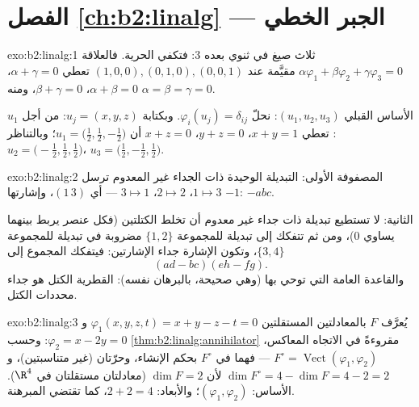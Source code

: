 \section*{الفصل \ref{ch:b2:linalg} --- الجبر الخطي}

\begin{solution}{exo:b2:linalg:1}
ثلاث صيغ في ثنوي بعده $3$: فتكفي الحرية. فالعلاقة
$\alpha\varphi_1 + \beta\varphi_2 + \gamma\varphi_3 = 0$ مقيَّمة عند
$(1,0,0), (0,1,0), (0,0,1)$ تعطي $\alpha + \gamma = 0$، $\alpha +
\beta = 0$، $\beta + \gamma = 0$، ومنه $\alpha = \beta = \gamma =
0$.

الأساس القبلي $(u_1, u_2, u_3)$: نحلّ $\varphi_i(u_j) =
\delta_{ij}$. وبكتابة $u_j = (x, y, z)$: من أجل $u_1$: تعطي $x + y = 1$،
$y + z = 0$، $x + z = 0$ أن $u_1 = \bigl(\tfrac12, \tfrac12,
-\tfrac12\bigr)$؛ وبالتناظر $u_2 = \bigl(-\tfrac12, \tfrac12,
\tfrac12\bigr)$، $u_3 = \bigl(\tfrac12, -\tfrac12, \tfrac12\bigr)$.
\end{solution}

\begin{solution}{exo:b2:linalg:2}
المصفوفة الأولى: التبديلة الوحيدة ذات الجداء غير المعدوم ترسل $1 \mapsto
3$، $2 \mapsto 2$، $3 \mapsto 1$ --- أي  $(1\,3)$،
وإشارتها $-1$:  $-abc$.

الثانية: لا تستطيع تبديلة ذات جداء غير معدوم أن تخلط الكتلتين
(فكل عنصر يربط بينهما يساوي $0$)، ومن ثم تتفكك إلى تبديلة
للمجموعة $\{1,2\}$ مضروبة في تبديلة للمجموعة $\{3,4\}$، وتكون الإشارة
جداء الإشارتين: فيتفكك المجموع إلى
\[
(ad - bc)(eh - fg) .
\]
والقاعدة العامة التي توحي بها (وهي صحيحة، بالبرهان نفسه):  القطرية الكتل هو جداء محددات
الكتل.
\end{solution}

\begin{solution}{exo:b2:linalg:3}
يُعرَّف $F$ بالمعادلتين المستقلتين $\varphi_1(x,y,z,t)
= x + y - z - t = 0$ و$\varphi_2 = x - 2y = 0$: وحسب
\cref{thm:b2:linalg:annihilator} مقروءةً في الاتجاه المعاكس، $F^\circ =
\operatorname{Vect}(\varphi_1, \varphi_2)$ --- فهما في $F^\circ$
بحكم الإنشاء، وحرّتان (غير متناسبتين)، و$\dim F^\circ
= 4 - \dim F = 4 - 2 = 2$ لأن $\dim F = 2$ (معادلتان مستقلتان
في $\R^4$). الأساس: $(\varphi_1, \varphi_2)$؛ والأبعاد:
$2 + 2 = 4$، كما تقتضي المبرهنة.
\end{solution}

